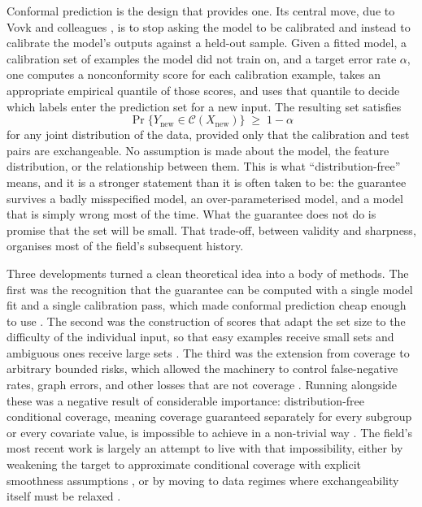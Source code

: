 \documentclass[a4paper,longmktitle]{cas-sc}
\begin{document}
Conformal prediction is the design that provides one. Its central move, due to Vovk and colleagues \cite{Vovk2005}, is to stop asking the model to be calibrated and instead to calibrate the model's outputs against a held-out sample. Given a fitted model, a calibration set of examples the model did not train on, and a target error rate $\alpha$, one computes a nonconformity score for each calibration example, takes an appropriate empirical quantile of those scores, and uses that quantile to decide which labels enter the prediction set for a new input. The resulting set satisfies
\begin{equation}
\Pr\{Y_{\text{new}} \in \mathcal{C}(X_{\text{new}})\} \;\geq\; 1-\alpha
\label{eq:coverage}
\end{equation}
for any joint distribution of the data, provided only that the calibration and test pairs are exchangeable. No assumption is made about the model, the feature distribution, or the relationship between them. This is what ``distribution-free'' means, and it is a stronger statement than it is often taken to be: the guarantee survives a badly misspecified model, an over-parameterised model, and a model that is simply wrong most of the time. What the guarantee does not do is promise that the set will be small. That trade-off, between validity and sharpness, organises most of the field's subsequent history.

Three developments turned a clean theoretical idea into a body of methods. The first was the recognition that the guarantee can be computed with a single model fit and a single calibration pass, which made conformal prediction cheap enough to use \cite{Lei2018,Angelopoulos2021intro}. The second was the construction of scores that adapt the set size to the difficulty of the individual input, so that easy examples receive small sets and ambiguous ones receive large sets \cite{Romano2020,RAPS}. The third was the extension from coverage to arbitrary bounded risks, which allowed the machinery to control false-negative rates, graph errors, and other losses that are not coverage \cite{Bates2021,LTT,CRC}. Running alongside these was a negative result of considerable importance: distribution-free conditional coverage, meaning coverage guaranteed separately for every subgroup or every covariate value, is impossible to achieve in a non-trivial way \cite{Barber2021}. The field's most recent work is largely an attempt to live with that impossibility, either by weakening the target to approximate conditional coverage with explicit smoothness assumptions \cite{Hore2024,Gibbs2025}, or by moving to data regimes where exchangeability itself must be relaxed \cite{Beyond,NonExchgCRC}.
\end{document}
